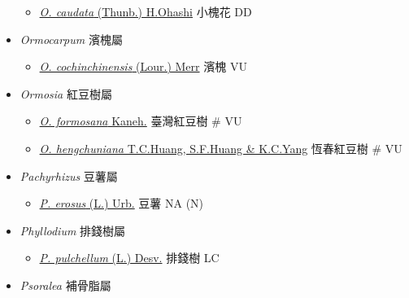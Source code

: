 \begin{itemize}
  \begin{itemize}
        \item[] \href{http://www.theplantlist.org/tpl1.1/search?q=Ohwia+caudata}{\textit{O. caudata} (Thunb.) H.Ohashi}   小槐花   DD
  \end{itemize}
 \item[] \textit{Ormocarpum} 濱槐屬
                                
  \begin{itemize}
        \item[] \href{http://www.theplantlist.org/tpl1.1/search?q=Ormocarpum+cochinchinensis}{\textit{O. cochinchinensis} (Lour.) Merr}   濱槐   VU
  \end{itemize}
 \item[] \textit{Ormosia} 紅豆樹屬
                                
  \begin{itemize}
        \item[] \href{http://www.theplantlist.org/tpl1.1/search?q=Ormosia+formosana}{\textit{O. formosana} Kaneh.}   臺灣紅豆樹  \# VU
        \item[] \href{http://www.theplantlist.org/tpl1.1/search?q=Ormosia+hengchuniana}{\textit{O. hengchuniana} T.C.Huang, S.F.Huang \& K.C.Yang}   恆春紅豆樹  \# VU
  \end{itemize}
 \item[] \textit{Pachyrhizus} 豆薯屬
                                
  \begin{itemize}
        \item[] \href{http://www.theplantlist.org/tpl1.1/search?q=Pachyrhizus+erosus}{\textit{P. erosus} (L.) Urb.}   豆薯   NA (N)
  \end{itemize}
 \item[] \textit{Phyllodium} 排錢樹屬
                                
  \begin{itemize}
        \item[] \href{http://www.theplantlist.org/tpl1.1/search?q=Phyllodium+pulchellum}{\textit{P. pulchellum} (L.) Desv.}   排錢樹   LC
  \end{itemize}
 \item[] \textit{Psoralea} 補骨脂屬
                                

\end{itemize}
